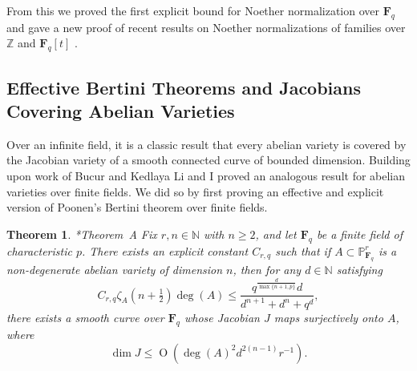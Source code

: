 \documentclass[11pt,reqno]{amsart}
\newtheorem{theorem}[lemma]{Theorem}
\newtheorem{cor}[lemma]{Corollary}
\theoremstyle{remark}
\newcommand{\Prob}{\operatorname{Prob}}
\newcommand{\fF}{\mathbf F}
\newcommand{\OO}{\operatorname{O}}
\newcommand{\N}{\mathbb{N}}
\renewcommand{\P}{\mathbb{P}}
\newcommand{\Z}{\mathbb{Z}}
\begin{document}


From this we proved the first explicit bound for Noether normalization over $\fF_{q}$ and gave a new proof of recent results on Noether normalizations of families over $\Z$ and $\fF_{q}[t]$ \cite{gabberLiuLorenzini15, cmbpt}.



\subsection{Effective Bertini Theorems and Jacobians Covering Abelian Varieties}

Over an infinite field, it is a classic result that every abelian variety is covered by the Jacobian variety of a smooth connected curve of bounded dimension. Building upon work of Bucur and Kedlaya \cite{bucurKedlaya12} Li and I proved an analogous result for abelian varieties over finite fields. We did so by first proving an effective and explicit version of Poonen's Bertini theorem over finite fields. 
\begin{theorem}\cite{bruceLi19}*{Theorem~A}
Fix $r,n\in \N$ with $n\geq2$, and let $\fF_{q}$ be a finite field of characteristic $p$. There exists an explicit constant $C_{r,q}$ such that if $A\subset \P^{r}_{\fF_q}$ is a non-degenerate abelian variety of dimension $n$, then for any $d\in \N$ satisfying 
\[
C_{r,q}\zeta_{A}\left(n+\tfrac{1}{2}\right) \deg(A) \leq  \frac{q^{\frac{d}{\max\{n+1,p\}}}d}{d^{n+1}+d^n+q^{d}},
\]
there exists a smooth curve over $\fF_{q}$ whose Jacobian $J$ maps surjectively onto $A$, where 
\[
\dim J\leq 
\OO\left( \deg(A)^2 d^{2(n-1)}r^{-1}\right).
\]
\end{theorem} 
\end{document}
